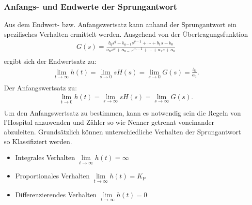 \subsubsection{Anfangs- und Endwerte der Sprungantwort}
%
Aus dem Endwert- bzw. Anfangswertsatz kann anhand der Sprungantwort ein spezifisches Verhalten ermittelt werden. Ausgehend von der Übertragungsfunktion
%
\begin{equation*}
\begin{aligned}
G(s)=\frac{b_{q}s^{q}+b_{q-1}s^{q-1}+\cdots+b_{1}s+b_{0}}{a_{n}s^{n}+a_{n-1}s^{n-1}+\cdots+a_{1}s+a_{0}}\\
\end{aligned}
\end{equation*}
%
ergibt sich der Endwertsatz zu:
%
\begin{equation*}
\begin{aligned}
\lim\limits_{t\rightarrow\infty}h(t)=\lim\limits_{s\rightarrow 0}sH(s)=\lim\limits_{s\rightarrow 0}G(s)=\frac{b_{0}}{a_{0}}.\\
\end{aligned}
\end{equation*}
%
Der Anfangswertsatz zu:
%
\begin{equation*}
\begin{aligned}
\lim\limits_{t\rightarrow 0}h(t)=\lim\limits_{s\rightarrow \infty}sH(s)=\lim\limits_{s\rightarrow \infty}G(s).\\
\end{aligned}
\end{equation*}
%
Um den Anfangswertsatz zu bestimmen, kann es notwendig sein die Regeln von l'Hospital anzuwenden und Zähler so wie Nenner getrennt voneinander abzuleiten. Grundsätzlich können unterschiedliche Verhalten der Sprungantwort so Klassifiziert werden.
%
\begin{itemize}
	\item Integrales Verhalten $\lim\limits_{t\rightarrow\infty}h(t)=\infty$
	\item Proportionales Verhalten $\lim\limits_{t\rightarrow\infty}h(t)=K_{\text{P}}$
	\item Differenzierendes Verhalten $\lim\limits_{t\rightarrow\infty}h(t)=0$
\end{itemize}
%
